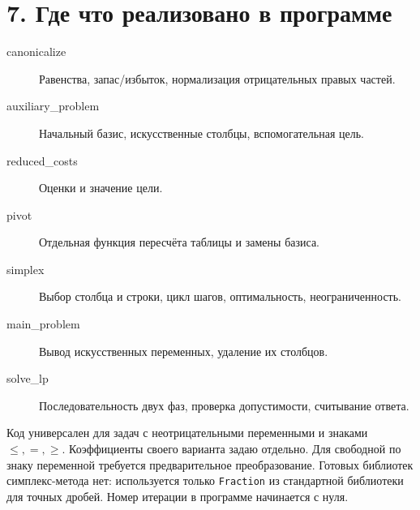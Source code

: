 \documentclass[12pt,a4paper]{article}
\begin{document}
\section*{7. Где что реализовано в программе}
\begin{description}
\item[canonicalize] Равенства, запас/избыток, нормализация отрицательных правых частей.
\item[auxiliary\_problem] Начальный базис, искусственные столбцы, вспомогательная цель.
\item[reduced\_costs] Оценки и значение цели.
\item[pivot] Отдельная функция пересчёта таблицы и замены базиса.
\item[simplex] Выбор столбца и строки, цикл шагов, оптимальность, неограниченность.
\item[main\_problem] Вывод искусственных переменных, удаление их столбцов.
\item[solve\_lp] Последовательность двух фаз, проверка допустимости, считывание ответа.
\end{description}

Код универсален для задач с неотрицательными переменными и знаками
$\le,=,\ge$. Коэффициенты своего варианта задаю отдельно.
Для свободной по знаку переменной требуется предварительное преобразование.
Готовых библиотек симплекс-метода нет: используется только
\texttt{Fraction} из стандартной библиотеки для точных дробей.
Номер итерации в программе начинается с нуля.
\end{document}
